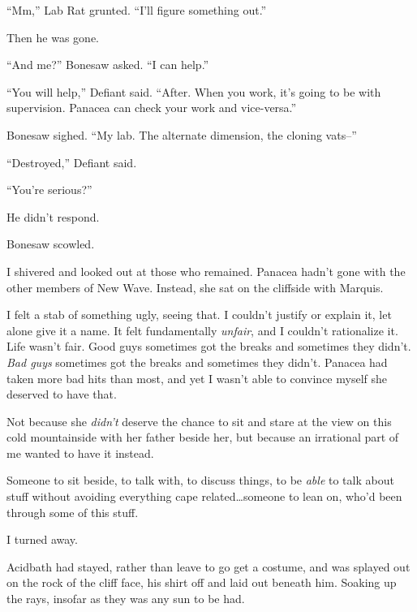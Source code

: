 ``Mm,'' Lab Rat grunted.  ``I'll figure something out.''



Then he was gone.



``And me?'' Bonesaw asked.  ``I can help.''



``You will help,'' Defiant said.  ``After.  When you work, it's going to be with supervision.  Panacea can check your work and vice-versa.''



Bonesaw sighed.  ``My lab.  The alternate dimension, the cloning vats--''



``Destroyed,'' Defiant said.



``You're serious?''



He didn't respond.



Bonesaw scowled.



I shivered and looked out at those who remained.  Panacea hadn't gone with the other members of New Wave.  Instead, she sat on the cliffside with Marquis.



I felt a stab of something ugly, seeing that.  I couldn't justify or explain it, let alone give it a name.  It felt fundamentally \emph{unfair}, and I couldn't rationalize it.  Life wasn't fair.  Good guys sometimes got the breaks and sometimes they didn't.  \emph{Bad guys} sometimes got the breaks and sometimes they didn't.  Panacea had taken more bad hits than most, and yet I wasn't able to convince myself she deserved to have that.



Not because she \emph{didn't} deserve the chance to sit and stare at the view on this cold mountainside with her father beside her, but because an irrational part of me wanted to have it instead.



Someone to sit beside, to talk with, to discuss things, to be \emph{able} to talk about stuff without avoiding everything cape related\ldots someone to lean on, who'd been through some of this stuff.



I turned away.



Acidbath had stayed, rather than leave to go get a costume, and was splayed out on the rock of the cliff face, his shirt off and laid out beneath him.  Soaking up the rays, insofar as they was any sun to be had.




